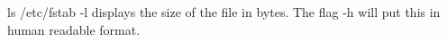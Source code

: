 ls /etc/fstab -l displays the size of the file in bytes. 
The flag -h will put this in human readable format.